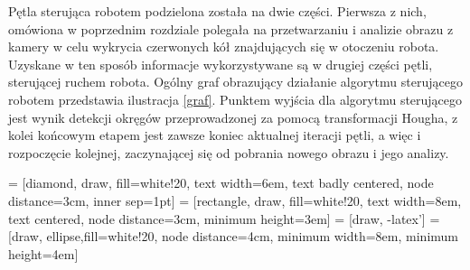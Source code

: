 
Pętla sterująca robotem podzielona została na dwie części. Pierwsza z nich, omówiona w poprzednim rozdziale polegała na przetwarzaniu i analizie obrazu z kamery w celu wykrycia czerwonych kół znajdujących się w otoczeniu robota. Uzyskane w ten sposób informacje wykorzystywane są w drugiej części pętli, sterującej ruchem robota. Ogólny graf obrazujący działanie algorytmu sterującego robotem przedstawia ilustracja \ref{graf}. Punktem wyjścia dla algorytmu sterującego jest wynik detekcji okręgów przeprowadzonej za pomocą transformacji Hougha, z kolei końcowym etapem jest zawsze koniec aktualnej iteracji pętli, a więc i rozpoczęcie kolejnej, zaczynającej się od pobrania nowego obrazu i jego analizy.

 = [diamond, draw, fill=white!20, 
    text width=6em, text badly centered, node distance=3cm, inner sep=1pt]
 = [rectangle, draw, fill=white!20, 
    text width=8em, text centered, node distance=3cm, minimum height=3em]
 = [draw, -latex']
 = [draw, ellipse,fill=white!20, node distance=4cm,
    minimum width=8em, minimum height=4em]
    
